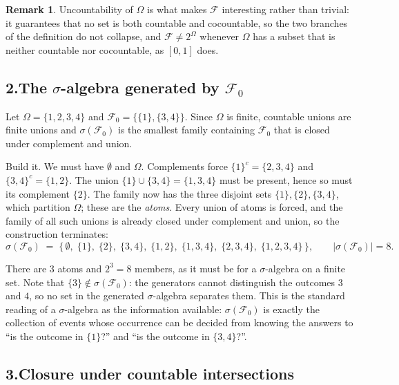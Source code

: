 \documentclass[11pt]{article}
\theoremstyle{definition}
\newtheorem{remark}{Remark}
\begin{document}
\begin{remark}
Uncountability of $\Omega$ is what makes $\mathcal{F}$ interesting rather
than trivial: it guarantees that no set is both countable and
cocountable, so the two branches of the definition do not collapse, and
$\mathcal{F} \ne 2^{\Omega}$ whenever $\Omega$ has a subset that is
neither countable nor cocountable, as $[0,1]$ does.
\end{remark}

\subsection*{2.\quad The $\sigma$-algebra generated by $\mathcal{F}_0$}

Let $\Omega = \{1,2,3,4\}$ and
$\mathcal{F}_0 = \big\{\{1\},\{3,4\}\big\}$. Since $\Omega$ is finite,
countable unions are finite unions and $\sigma(\mathcal{F}_0)$ is the
smallest family containing $\mathcal{F}_0$ that is closed under
complement and union.

Build it. We must have $\emptyset$ and $\Omega$. Complements force
$\{1\}^{c} = \{2,3,4\}$ and $\{3,4\}^{c} = \{1,2\}$. The union
$\{1\}\cup\{3,4\} = \{1,3,4\}$ must be present, hence so must its
complement $\{2\}$. The family now has the three disjoint sets
$\{1\},\{2\},\{3,4\}$, which partition $\Omega$; these are the
\emph{atoms}. Every union of atoms is forced, and the family of all such
unions is already closed under complement and union, so the construction
terminates:
\[
  \sigma(\mathcal{F}_0) \;=\;
  \Big\{\, \emptyset,\;
    \{1\},\; \{2\},\; \{3,4\},\;
    \{1,2\},\; \{1,3,4\},\; \{2,3,4\},\;
    \{1,2,3,4\} \,\Big\},
  \qquad |\sigma(\mathcal{F}_0)| = 8 .
\]

There are $3$ atoms and $2^{3} = 8$ members, as it must be for a
$\sigma$-algebra on a finite set. Note that $\{3\} \notin
\sigma(\mathcal{F}_0)$: the generators cannot distinguish the outcomes
$3$ and $4$, so no set in the generated $\sigma$-algebra separates them.
This is the standard reading of a $\sigma$-algebra as the information
available: $\sigma(\mathcal{F}_0)$ is exactly the collection of events
whose occurrence can be decided from knowing the answers to
``is the outcome in $\{1\}$?'' and ``is the outcome in $\{3,4\}$?''.

\subsection*{3.\quad Closure under countable intersections}
\end{document}
